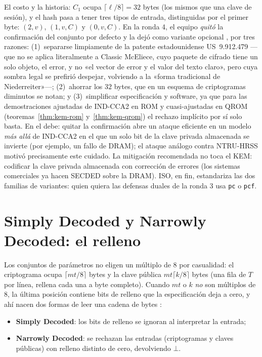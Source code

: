 \documentclass[11pt,a4paper,oneside]{report}
\begin{document}
El costo y la historia: $C_1$ ocupa $\lceil\ell/8\rceil=32$ bytes (los
mismos que una clave de sesión), y el hash pasa a tener tres tipos de
entrada, distinguidas por el primer byte: $(2,v)$, $(1,v,C)$ y
$(0,v,C)$. En la ronda 4, el equipo \emph{quitó} la confirmación del
conjunto por defecto y la dejó como variante opcional
\cite{cmmods3}, por tres razones: (1)~separarse limpiamente de la
patente estadounidense US~9.912.479 ---que no se aplica literalmente
a Classic McEliece, cuyo paquete de cifrado tiene un solo objeto, el
error, y no «el vector de error y el valor del texto claro», pero cuya
sombra legal se prefirió despejar, volviendo a la «forma tradicional
de Niederreiter»---; (2)~ahorrar los $32$ bytes, que en un esquema de
criptogramas diminutos se notan; y (3)~simplificar especificación y
software, ya que para las demostraciones ajustadas de IND-CCA2 en ROM
y cuasi-ajustadas en QROM (teoremas~\ref{thm:kem-rom}
y~\ref{thm:kem-qrom}) el rechazo implícito por sí solo basta.
En el debe: quitar la confirmación abre un ataque eficiente en un
modelo \emph{más allá} de IND-CCA2 en el que un solo bit de la clave
privada almacenada se invierte (por ejemplo, un fallo de DRAM); el
ataque análogo contra NTRU-HRSS \cite{ntrufault} motivó precisamente
este cuidado. La mitigación recomendada no toca el KEM: codificar la
clave privada almacenada con corrección de errores (los sistemas
comerciales ya hacen SECDED sobre la DRAM). ISO, en fin, estandariza
las dos familias de variantes: quien quiera las defensas duales de la
ronda 3 usa \texttt{pc} o \texttt{pcf}.

\section{Simply Decoded y Narrowly Decoded: el relleno}
\label{sec:param-narrowly}

Los conjuntos de parámetros no eligen un múltiplo de $8$ por
casualidad: el criptograma ocupa $\lceil mt/8\rceil$ bytes y la clave
pública $mt\lceil k/8\rceil$ bytes (una fila de $T$ por línea, rellena
cada una a byte completo). Cuando $mt$ o $k$ \emph{no} son múltiplos
de $8$, la última posición contiene bits de relleno que la
especificación deja a cero, y ahí nacen dos formas de leer una cadena
de bytes \cite{cmspec}:

\begin{itemize}[leftmargin=1.5em,itemsep=3pt]
  \item \textbf{Simply Decoded}: los bits de relleno se ignoran al
        interpretar la entrada;
  \item \textbf{Narrowly Decoded}: se rechazan las entradas
        (criptogramas y claves públicas) con relleno distinto de
        cero, devolviendo $\bot$.
\end{itemize}
\end{document}
